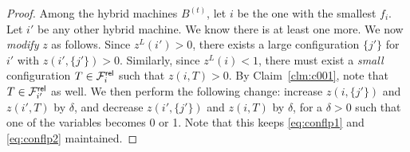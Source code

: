\documentclass{article}[11pt]
\newcommand{\barcalS}{\bar{\cal S}\xspace}
\newcommand{\brt}{{(t)}}
\begin{document}
\begin{proof}
	
Among the hybrid machines $ B^\brt$, let $i$  be the one with the smallest $f_i$. Let $i'$ be any other hybrid machine. We know there is at least one more.
%	
%	
	We now \emph{modify} $z$ as follows.
	Since $z^L(i') > 0$, there exists a large configuration $\{j'\}$ for $i'$ with $z(i',\{j'\}) > 0$. Similarly, since $z^L(i) < 1$, there must exist a {\em small} configuration $T\in {\cal F}^{\mathsf{rel}}_i$ such that $z(i,T) > 0$.
	By Claim~\ref{clm:c001}, note that $T\in {\cal F}^{\mathsf{rel}}_{i'}$ as well.
	We then perform the following change: increase $z(i,\{j'\})$ and $z(i',T)$ by $\delta$,  and decrease $z(i',\{j'\})$ and $z(i,T)$ by $\delta$, for a $\delta > 0$ such that one of the variables becomes 0 or 1.
	Note that this keeps \eqref{eq:conflp1} and \eqref{eq:conflp2} maintained. 	%
	

\end{proof}
\end{document}
